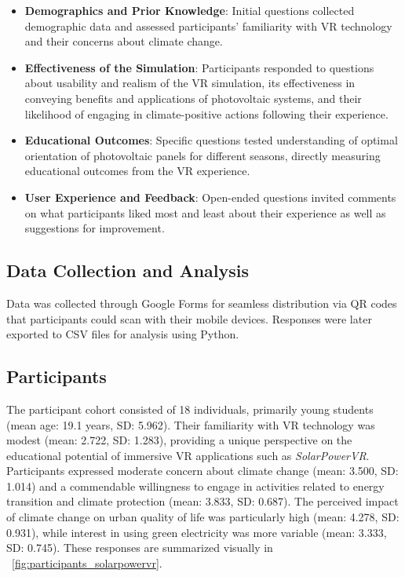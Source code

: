 \documentclass[draft, final]{vutinfth} %
\begin{document}
\begin{itemize}
    \item \textbf{Demographics and Prior Knowledge}: Initial questions collected demographic data and assessed participants' familiarity with VR technology and their concerns about climate change.
    \item \textbf{Effectiveness of the Simulation}: Participants responded to questions about usability and realism of the VR simulation, its effectiveness in conveying benefits and applications of photovoltaic systems, and their likelihood of engaging in climate-positive actions following their experience.
    \item \textbf{Educational Outcomes}: Specific questions tested understanding of optimal orientation of photovoltaic panels for different seasons, directly measuring educational outcomes from the VR experience.
    \item \textbf{User Experience and Feedback}: Open-ended questions invited comments on what participants liked most and least about their experience as well as suggestions for improvement.
\end{itemize}

\subsection{Data Collection and Analysis}

Data was collected through Google Forms for seamless distribution via QR codes that participants could scan with their mobile devices. Responses were later exported to CSV files for analysis using Python.

\subsection{Participants}
The participant cohort consisted of 18 individuals, primarily young students (mean age: 19.1 years, SD: 5.962). Their familiarity with VR technology was modest (mean: 2.722, SD: 1.283), providing a unique perspective on the educational potential of immersive VR applications such as \textit{SolarPowerVR}. Participants expressed moderate concern about climate change (mean: 3.500, SD: 1.014) and a commendable willingness to engage in activities related to energy transition and climate protection (mean: 3.833, SD: 0.687). The perceived impact of climate change on urban quality of life was particularly high (mean: 4.278, SD: 0.931), while interest in using green electricity was more variable (mean: 3.333, SD: 0.745). These responses are summarized visually in \figurename~\ref{fig:participants_solarpowervr}.
\end{document}

